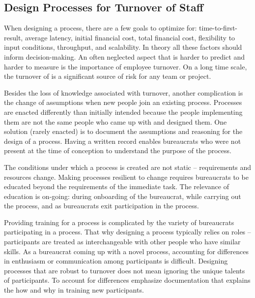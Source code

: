 \subsection*{Design Processes for Turnover of Staff\label{sec:turnover}}


When designing a \gls{process}, there are a few goals to optimize for: time-to-first-result, average latency, initial financial cost, total financial cost, flexibility to input conditions, throughput, and scalability. In theory all these factors should inform decision-making. An often neglected aspect that is harder to predict and harder to measure is the importance of employee turnover. 
On a long time scale, the turnover of \iftoggle{glossarysubstitutionworks}{\glspl{bureaucrat}}{bureaucrats} is 
a significant source of risk for any team or project. 

Besides the loss of knowledge associated with turnover, another complication is the change of assumptions when new people join an existing process. 
Processes are enacted differently than initially intended because the people implementing them are not the same people who came up with and designed them. One solution (rarely enacted) is to document the assumptions and reasoning for the design of a process. Having a written record enables bureaucrats who were not present at the time of conception to understand the purpose of the process. 

The conditions under which a process is created are not static -- requirements and resources change. 
Making processes resilient to change requires  bureaucrats to be educated beyond the requirements of the immediate task. The relevance of education is on-going: during onboarding of the bureaucrat, while carrying out the process, and as bureaucrats exit participation in the process. 

Providing training for a process is complicated by the variety of bureaucrats participating in a process.
That why designing a process typically relies on roles -- participants are treated as interchangeable with other people who have similar skills. As a bureaucrat coming up with a novel process, accounting for differences in enthusiasm or communication among participants is difficult. 
Designing processes that are robust to turnover does not mean ignoring the unique talents of participants. 
To account for differences emphasize documentation that explains the how and why in training new participants. 
%


